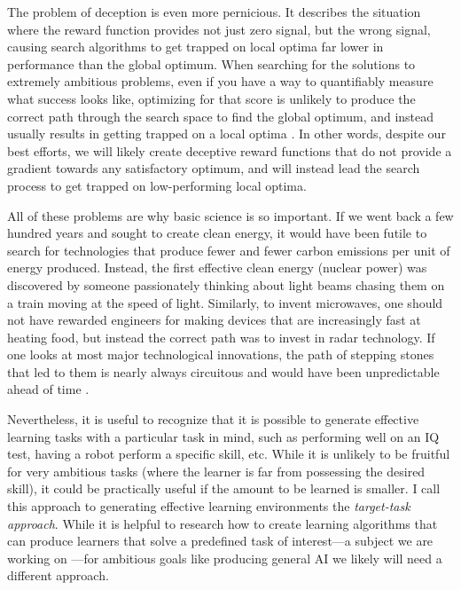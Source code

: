 \documentclass{article}
\begin{document}
The problem of deception is even more pernicious. It describes the situation where the reward function provides not just zero signal, but the wrong signal, causing search algorithms to get trapped on local optima far lower in performance than the global optimum. When searching for the solutions to extremely ambitious problems, even if you have a way to quantifiably measure what success looks like, optimizing for that score is unlikely to produce the correct path through the search space to find the global optimum, and instead usually results in getting trapped on a local optima \cite{stanley2015greatness,lehman2011abandoning,woolley2011deleterious,nguyen2016understanding}. In other words, despite our best efforts, we will likely create deceptive reward functions that do not provide a gradient towards any satisfactory optimum, and will instead lead the search process to get trapped on low-performing local optima.  

All of these problems are why basic science is so important. If we went back a few hundred years and sought to create clean energy, it would have been futile to search for technologies that produce fewer and fewer carbon emissions per unit of energy produced. Instead, the first effective clean energy (nuclear power) was discovered by someone passionately thinking about light beams chasing them on a train moving at the speed of light. Similarly, to invent microwaves, one should not have rewarded engineers for making devices that are increasingly fast at heating food, but instead the correct path was to invest in radar technology.  If one looks at most major technological innovations, the path of stepping stones that led to them is nearly always circuitous and would have been unpredictable ahead of time \cite{stanley2015greatness}. 

Nevertheless, it is useful to recognize that it is possible to generate effective learning tasks with a particular task in mind, such as performing well on an IQ test, having a robot perform a specific skill, etc. While it is unlikely to be fruitful for very ambitious tasks (where the learner is far from possessing the desired skill), it could be practically useful if the amount to be learned is smaller. I call this approach to generating effective learning environments the \emph{target-task approach}. While it is helpful to research how to create learning algorithms that can produce learners that solve a predefined task of interest---a subject we are working on \cite{petroskisuch2019GTN}---for ambitious goals like producing general AI we likely will need a different approach. 
\end{document}
